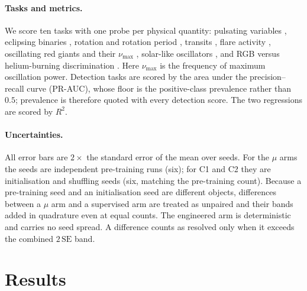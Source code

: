 \documentclass{article}
\begin{document}
\paragraph{Tasks and metrics.} We score ten tasks with one probe per physical quantity: pulsating
variables \citep{gao2025}, eclipsing binaries \citep{prsa2022}, rotation and rotation period
\citep{boyle2026}, transits \citep{guerrero2021}, flare activity \citep{seli2025,vida2021},
oscillating red giants and their $\nu_{\max}$ \citep{hon2021}, solar-like oscillators
\citep{hatt2023}, and RGB versus helium-burning discrimination \citep{sreenivas2026}. Here
$\nu_{\max}$ is the frequency of maximum oscillation power. Detection tasks are scored by the area
under the precision--recall curve (PR-AUC), whose floor is the positive-class prevalence rather than
$0.5$; prevalence is therefore quoted with every detection score. The two regressions are scored by
$R^{2}$.

\paragraph{Uncertainties.} All error bars are $2\times$ the standard error of the mean over seeds.
For the $\mu$ arms the seeds are independent pre-training runs (six); for C1 and C2 they are
initialisation and shuffling seeds (six, matching the pre-training count). Because a pre-training seed
and an initialisation seed are different objects, differences between a $\mu$ arm and a supervised arm
are treated as unpaired and their bands added in quadrature even at equal counts. The engineered arm is
deterministic and carries no seed spread.
A difference counts as resolved only when it exceeds the combined $2\,\mathrm{SE}$ band.

\section{Results}

\begin{table}[t]
\caption{Ten-task scorecard. Linear-readout arms use a frozen logistic or ridge readout on the
mean-pooled representation; the two supervised arms are trained end-to-end per task. Bold marks a
leader separated from the runner-up by the combined $2\,\mathrm{SE}$ band; italic marks a leader that
is only the point-estimate argmax. $n$ is the test-star count and prev.\ the positive-class prevalence.}
\label{tab:scorecard}
\centering
\small

\end{table}
\end{document}
